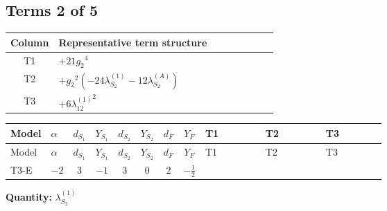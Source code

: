 \documentclass[8pt]{article}
\begin{document}
\begin{landscape}
\subsection*{Terms 2 of 5}
\begin{center}
\begin{tabular}{@{}c >{\raggedright\arraybackslash}p{0.82\linewidth}@{}}
\toprule
Column & Representative term structure \\
\midrule
T1 & \(\displaystyle +21 {g_2}^4\) \\
\midrule
T2 & \(\displaystyle +{g_2}^2 (-24 {\lambda_{S_2}^{(1)}}-12 {\lambda_{S_2}^{(A)}})\) \\
\midrule
T3 & \(\displaystyle +6 {\lambda_{12}^{(1)}}^2\) \\
\midrule
\bottomrule
\end{tabular}
\end{center}
\smallskip
\tiny
\begin{longtable}{@{}llcccccc >{\raggedright\arraybackslash}p{0.21\linewidth} >{\raggedright\arraybackslash}p{0.21\linewidth} >{\raggedright\arraybackslash}p{0.21\linewidth}@{}}
\toprule
Model & $\alpha$ & $d_{S_1}$ & $Y_{S_1}$ & $d_{S_2}$ & $Y_{S_2}$ & $d_F$ & $Y_F$ & T1 & T2 & T3 \\
\midrule
\endfirsthead
\toprule
Model & $\alpha$ & $d_{S_1}$ & $Y_{S_1}$ & $d_{S_2}$ & $Y_{S_2}$ & $d_F$ & $Y_F$ & T1 & T2 & T3 \\
\midrule
\endhead
T3-E & $-2$ & $3$ & $-1$ & $3$ & $0$ & $2$ & $-\frac{1}{2}$ & \scriptsize\adjustbox{max width=\linewidth}{$\begin{gathered} +21 {g_2}^4\end{gathered}$} & \scriptsize\adjustbox{max width=\linewidth}{$\begin{gathered} +{g_2}^2 (-24 {\lambda_{S_2}^{(1)}}-12 {\lambda_{S_2}^{(A)}})\end{gathered}$} & \scriptsize\adjustbox{max width=\linewidth}{$\begin{gathered} +6 {\lambda_{12}^{(1)}}^2\end{gathered}$} \\
\midrule
\bottomrule
\end{longtable}
\clearpage
\noindent\textbf{Quantity: }$\lambda_{S_2}^{(1)}$\par\smallskip

\end{landscape}
\end{document}
